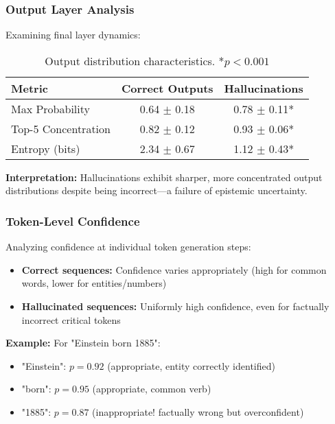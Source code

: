 \documentclass[11pt]{article}
\begin{document}
\subsubsection{Output Layer Analysis}

Examining final layer dynamics:

\begin{table}[H]
\centering
\begin{tabular}{@{}lcc@{}}
\toprule
\textbf{Metric} & \textbf{Correct Outputs} & \textbf{Hallucinations} \\ \midrule
Max Probability & 0.64 $\pm$ 0.18 & 0.78 $\pm$ 0.11* \\
Top-5 Concentration & 0.82 $\pm$ 0.12 & 0.93 $\pm$ 0.06* \\
Entropy (bits) & 2.34 $\pm$ 0.67 & 1.12 $\pm$ 0.43* \\ \bottomrule
\end{tabular}
\caption{Output distribution characteristics. *$p < 0.001$}
\end{table}

\textbf{Interpretation:} Hallucinations exhibit sharper, more concentrated output distributions despite being incorrect---a failure of epistemic uncertainty.

\subsubsection{Token-Level Confidence}

Analyzing confidence at individual token generation steps:

\begin{itemize}
    \item \textbf{Correct sequences:} Confidence varies appropriately (high for common words, lower for entities/numbers)
    \item \textbf{Hallucinated sequences:} Uniformly high confidence, even for factually incorrect critical tokens
\end{itemize}

\textbf{Example:} For "Einstein born 1885":
\begin{itemize}
    \item "Einstein": $p = 0.92$ (appropriate, entity correctly identified)
    \item "born": $p = 0.95$ (appropriate, common verb)
    \item "1885": $p = 0.87$ (inappropriate! factually wrong but overconfident)
\end{itemize}
\end{document}
